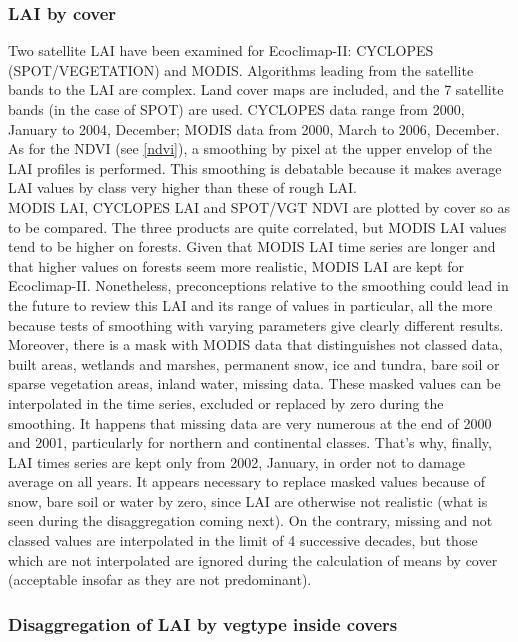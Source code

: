 \subsubsection{LAI by cover}

Two satellite LAI have been examined for Ecoclimap-II: CYCLOPES (SPOT/VEGETATION) and MODIS. Algorithms leading from the satellite bands 
to the LAI are complex. Land cover maps are included, and the 7 satellite bands (in the case of SPOT) are used. CYCLOPES data range 
from 2000, January to 2004, December; MODIS data from 2000, March to 2006, December. As for the NDVI (see \ref{ndvi}), 
a smoothing by pixel at the 
upper envelop of the LAI profiles is performed. This smoothing is debatable because it makes average LAI values by class very higher 
than these of rough LAI. \\
MODIS LAI, CYCLOPES LAI and SPOT/VGT NDVI are plotted by cover so as to be compared. The three 
products are quite correlated, but MODIS LAI values tend to be higher on forests. Given that 
MODIS LAI time series are longer and that higher values on forests seem more realistic, MODIS LAI are kept 
for Ecoclimap-II. Nonetheless, preconceptions relative to the smoothing could lead in the future to review this LAI and its 
range of values in particular, all the more because tests of smoothing with varying parameters give clearly different results. \\
Moreover, there is a mask with MODIS data that distinguishes not classed data, built areas, wetlands and marshes, permanent 
snow, ice and tundra, bare soil or sparse vegetation areas, inland water, missing data. These masked values can be interpolated in the time 
series, excluded or replaced by zero during the smoothing. It happens that missing data are very numerous at the end of 2000 and 2001, 
particularly for northern and continental classes. That's why, finally, LAI times series are kept only from 2002, January, in order not 
to damage average on all years. It appears necessary to replace masked values because of snow, bare soil or water by zero, since 
LAI are otherwise not realistic (what is seen during the disaggregation coming next). On the contrary, missing and not classed values are interpolated 
in the limit of 4 successive decades, but those which are not interpolated are ignored during the calculation of means by cover 
(acceptable insofar as they are not predominant). 


\subsubsection{Disaggregation of LAI by vegtype inside covers}

